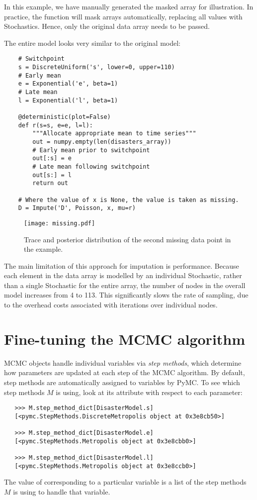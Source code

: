 In this example, we have manually generated the masked array for illustration. In practice, the  function will mask arrays automatically, replacing all  values with Stochastics. Hence, only the original data array needs to be passed.

The entire model looks very similar to the original model:

\begin{verbatim}
	# Switchpoint
	s = DiscreteUniform('s', lower=0, upper=110)
	# Early mean
	e = Exponential('e', beta=1)
	# Late mean
	l = Exponential('l', beta=1)

	@deterministic(plot=False)
	def r(s=s, e=e, l=l):
	    """Allocate appropriate mean to time series"""
	    out = numpy.empty(len(disasters_array))
	    # Early mean prior to switchpoint
	    out[:s] = e
	    # Late mean following switchpoint
	    out[s:] = l
	    return out

	# Where the value of x is None, the value is taken as missing.
	D = Impute('D', Poisson, x, mu=r)
\end{verbatim}

\begin{figure}[ht]
\begin{center}
\texttt{[image: missing.pdf]}
\caption{Trace and posterior distribution of the second missing data point in the example.}
\label{fig:missing}
\end{center}
\end{figure}


The main limitation of this approach for imputation is performance. Because each
element in the data array is modelled by an individual Stochastic, rather than a
single Stochastic for the entire array, the number of nodes in the overall model
increases from 4 to 113. This significantly slows the rate of sampling, due to
the overhead costs associated with iterations over individual nodes.



\section{Fine-tuning the MCMC algorithm}

MCMC objects handle individual variables via \emph{step methods}, which determine how parameters are updated at each step of the MCMC algorithm. By default, step methods are automatically assigned to variables by PyMC. To see which step methods $M$ is using, look at its  attribute with respect to each parameter:
\begin{verbatim}
   >>> M.step_method_dict[DisasterModel.s]
   [<pymc.StepMethods.DiscreteMetropolis object at 0x3e8cb50>]

   >>> M.step_method_dict[DisasterModel.e]
   [<pymc.StepMethods.Metropolis object at 0x3e8cbb0>]

   >>> M.step_method_dict[DisasterModel.l]
   [<pymc.StepMethods.Metropolis object at 0x3e8ccb0>]
\end{verbatim}
The value of  corresponding to a particular variable is a list of the step methods $M$ is using to handle that variable.

